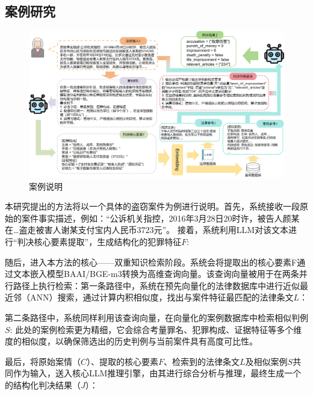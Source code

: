 \subsection{\heiti 案例研究}
\begin{figure}[htpb]
	\centering
	\includegraphics[width=0.8\linewidth]{fig/case.pdf}
	\caption{案例说明}
	\label{fig:case}
\end{figure}
本研究提出的方法将以一个具体的盗窃案件为例进行说明。首先，系统接收一段原始的案件事实描述，例如：“公诉机关指控，2016年3月28日20时许，被告人颜某在…盗走被害人谢某支付宝内人民币3723元”。
接着，系统利用LLM对该文本进行“判决核心要素提取”，生成结构化的犯罪特征$F$:


随后，进入本方法的核心——双重知识检索阶段。系统会将提取出的核心要素F通过文本嵌入模型BAAI/BGE-m3转换为高维查询向量。该查询向量被用于在两条并行路径上执行检索：第一条路径中，系统在预先向量化的法律数据库中进行近似最近邻（ANN）搜索，通过计算内积相似度，找出与案件特征最匹配的法律条文$L$：


第二条路径中，系统同样利用该查询向量，在向量化的案例数据库中检索相似判例$S$:
此处的案例检索更为精细，它会综合考量罪名、犯罪构成、证据特征等多个维度的相似度，以确保筛选出的历史判例与当前案件具有高度可比性。


最后，将原始案情（$C$）、提取的核心要素$F$、检索到的法律条文$L$及相似案例$S$共同作为输入，送入核心LLM推理引擎，由其进行综合分析与推理，最终生成一个的结构化判决结果（$J$）：

